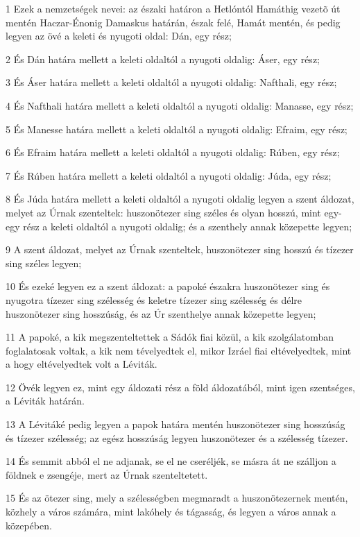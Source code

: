 \par 1 Ezek a nemzetségek nevei: az északi határon a Hetlóntól Hamáthig vezetõ út mentén Haczar-Énonig Damaskus határán, észak felé, Hamát mentén, és pedig legyen az övé a keleti és nyugoti oldal: Dán, egy rész;
\par 2 És Dán határa mellett a keleti oldaltól a nyugoti oldalig: Áser, egy rész;
\par 3 És Áser határa mellett a keleti oldaltól a nyugoti oldalig: Nafthali, egy rész;
\par 4 És Nafthali határa mellett a keleti oldaltól a nyugoti oldalig: Manasse, egy rész;
\par 5 És Manesse határa mellett a keleti oldaltól a nyugoti oldalig: Efraim, egy rész;
\par 6 És Efraim határa mellett a keleti oldaltól a nyugoti oldalig: Rúben, egy rész;
\par 7 És Rúben határa mellett a keleti oldaltól a nyugoti oldalig: Júda, egy rész;
\par 8 És Júda határa mellett a keleti oldaltól a nyugoti oldalig legyen a szent áldozat, melyet az Úrnak szenteltek: huszonötezer sing széles és olyan hosszú, mint egy-egy rész a keleti oldaltól a nyugoti oldalig; és a szenthely annak közepette legyen;
\par 9 A szent áldozat, melyet az Úrnak szenteltek, huszonötezer sing hosszú és tízezer sing széles legyen;
\par 10 És ezeké legyen ez a szent áldozat: a papoké északra huszonötezer sing és nyugotra tízezer sing szélesség és keletre tízezer sing szélesség és délre huszonötezer sing hosszúság, és az Úr szenthelye annak közepette legyen;
\par 11 A papoké, a kik megszenteltettek a Sádók fiai közül, a kik szolgálatomban foglalatosak voltak, a kik nem tévelyedtek el, mikor Izráel fiai eltévelyedtek, mint a hogy eltévelyedtek volt a Léviták.
\par 12 Övék legyen ez, mint egy áldozati rész a föld áldozatából, mint igen szentséges, a Léviták határán.
\par 13 A Lévitáké pedig legyen a papok határa mentén huszonötezer sing hosszúság és tízezer szélesség; az egész hosszúság legyen huszonötezer és a szélesség tízezer.
\par 14 És semmit abból el ne adjanak, se el ne cseréljék, se másra át ne szálljon a földnek e zsengéje, mert az Úrnak szenteltetett.
\par 15 És az ötezer sing, mely a szélességben megmaradt a huszonötezernek mentén, közhely a város számára, mint lakóhely és tágasság, és legyen a város annak a közepében.
